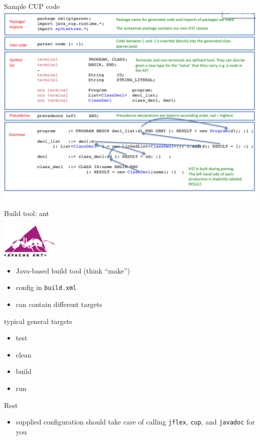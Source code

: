 \documentclass{beamer}
\begin{document}
\begin{frame}[label={sec:org40ef0a7}]{Sample CUP code}
\includegraphics[width=\textwidth]{figures/snaps/cupcode}
\end{frame}



\begin{frame}[label={sec:org867891d},fragile]{Build tool: ant}

 \begin{center}
 \includegraphics[width=0.2\textwidth]{figures/snaps/antlogo}
\end{center}


\begin{itemize}
\item Java-based build tool (think ``make'')
\item config in \texttt{build.xml}
\item can contain different \alert{targets}
\end{itemize}

\begin{block}{typical general targets}
\begin{itemize}
\item test
\item clean
\item build
\item run
\end{itemize}
\end{block}

\begin{block}{Rest}
\begin{itemize}
\item supplied configuration should take care of calling \texttt{jflex}, \texttt{cup}, and
\texttt{javadoc} for you
\end{itemize}
\end{block}
\end{frame}
\end{document}
